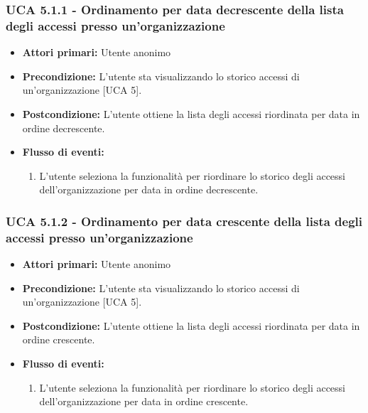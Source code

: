 \subsubsection{UCA 5.1.1 - Ordinamento per data decrescente della lista degli accessi presso un'organizzazione}
\begin{itemize}
	\item \textbf{Attori primari:} Utente anonimo
	\item \textbf{Precondizione:} L'utente sta visualizzando lo storico accessi di un'organizzazione [UCA 5].
	\item \textbf{Postcondizione:} L'utente ottiene la lista degli accessi riordinata per data in ordine decrescente.
	\item \textbf{Flusso di eventi:}
	\begin{enumerate}
		\item L'utente seleziona la funzionalità per riordinare lo storico degli accessi dell'organizzazione per data in ordine decrescente.
	\end{enumerate}   
\end{itemize}

\subsubsection{UCA 5.1.2 - Ordinamento per data crescente della lista degli accessi presso un'organizzazione}
\begin{itemize}
	\item \textbf{Attori primari:} Utente anonimo
	\item \textbf{Precondizione:} L'utente sta visualizzando lo storico accessi di un'organizzazione [UCA 5].
	\item \textbf{Postcondizione:} L'utente ottiene la lista degli accessi riordinata per data in ordine crescente.
	\item \textbf{Flusso di eventi:}
	\begin{enumerate}
		\item L'utente seleziona la funzionalità per riordinare lo storico degli accessi dell'organizzazione per data in ordine crescente.
	\end{enumerate}
\end{itemize}

